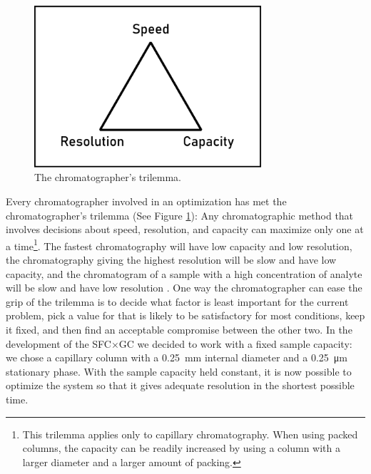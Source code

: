 \begin{figure}
\centering
\includegraphics[width=0.75\textwidth]{Figures/Triangle.pdf}
\decoRule
\caption[Schematic diagram of a the chromatographer's trilemma.]{The chromatographer's trilemma.}
\label{fig:trilemma}
\end{figure}


Every chromatographer involved in an optimization has met the chromatographer's
trilemma (See Figure \ref{fig:trilemma}): Any chromatographic method that
involves decisions about speed, resolution, and capacity can maximize only one
at a time\footnote{This trilemma applies only to capillary chromatography. When
using packed columns, the capacity can be readily increased by using a column
with a larger diameter and a larger amount of packing.}. The fastest
chromatography will have low capacity and low resolution, the chromatography
giving the highest resolution will be slow and have low capacity, and the
chromatogram of a sample with a high concentration of analyte will be slow and
have low resolution \autocite{Klee2002}. One way the chromatographer can ease
the grip of the trilemma is to decide what factor is least important for the
current problem, pick a value for that is likely to be satisfactory for most
conditions, keep it fixed, and then find an acceptable compromise between the
other two. In the development of the SFC×GC we decided to work with a fixed
sample capacity: we chose a capillary column with a \SI{0.25}{\milli\metre}
internal diameter and a \SI{0.25}{\micro\metre} stationary phase. With the
sample capacity held constant, it is now possible to optimize the system so that
it gives adequate resolution in the shortest possible time.

